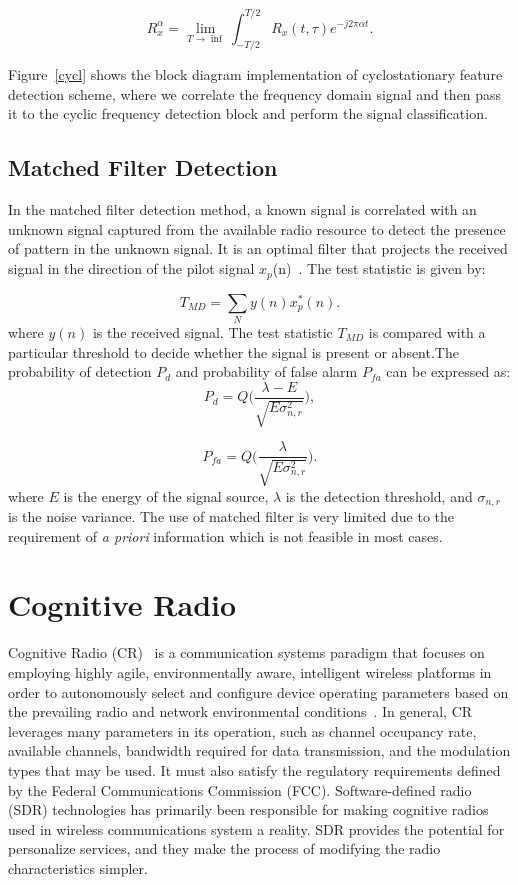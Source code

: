 \begin{equation}
R_x^{\alpha} = \lim_{T\rightarrow \inf}\int_{-T/2}^{T/2} R_x(t,\tau)e^{-j2\pi\alpha t}.
\end{equation}

Figure~\ref{cycl} shows the block diagram implementation of cyclostationary feature detection scheme, where we correlate the frequency domain signal and then pass it to the cyclic frequency detection block and perform the signal classification.

\subsection{Matched Filter Detection}

In the matched filter detection method, a known signal is correlated with an unknown signal captured from the available radio resource to detect the presence of pattern in the unknown signal. It is an optimal filter that projects the received signal in the direction of the pilot signal $x_p$(n)~\cite{weidling2005framework}. The test statistic is given by:

\begin{equation}
T_{MD} = \sum_N y(n)x^*_p(n).
\end{equation}
where $y(n)$ is the received signal. The test statistic $T_{MD}$ is compared with a particular threshold to decide whether the signal is present or absent.The probability of detection $P_d$ and probability of false alarm $P_{fa}$ can be expressed as:
\begin{equation}
P_d = Q\bigg(\dfrac{\lambda-E}{\sqrt{E\sigma_{n,r}^2}}\bigg),
\end{equation}

\begin{equation}
P_{fa} = Q\bigg(\dfrac{\lambda}{\sqrt{E\sigma_{n,r}^2}}\bigg).
\end{equation}
where $E$ is the energy of the signal source, $\lambda$ is the detection threshold, and $\sigma_{n,r}$ is the noise variance. The use of matched filter is very limited due to the requirement of \textit{a priori} information which is not feasible in most cases. 

\section{Cognitive Radio}
Cognitive Radio (CR)~\cite{cogjm} is a communication systems paradigm that focuses on employing highly agile, environmentally aware, intelligent wireless platforms in
order to autonomously select and configure device operating parameters based on the prevailing radio and network environmental conditions~\cite{bookhtn1}. In general, CR leverages many parameters in its operation, such as channel occupancy rate, available channels, bandwidth required for data transmission, and the modulation types that may be used. It must also satisfy the regulatory requirements defined by the Federal Communications Commission (FCC). Software-defined radio (SDR) technologies has primarily been responsible for making cognitive radios used in wireless communications system a reality. SDR provides the potential for personalize services, and they make the process of modifying the radio characteristics simpler. 

